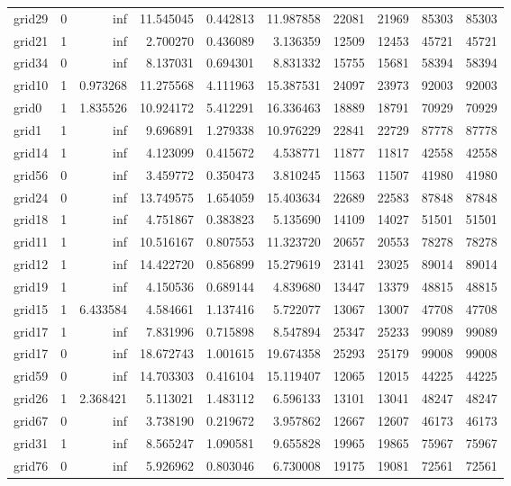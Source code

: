 \begin{longtable}{|l|r|r|r|r|r|r|r|r|r|}
grid29 & 0 & inf & 11.545045 & 0.442813 & 11.987858 & 22081 & 21969 & 85303 & 85303 \\
grid21 & 1 & inf & 2.700270 & 0.436089 & 3.136359 & 12509 & 12453 & 45721 & 45721 \\
grid34 & 0 & inf & 8.137031 & 0.694301 & 8.831332 & 15755 & 15681 & 58394 & 58394 \\
grid10 & 1 & 0.973268 & 11.275568 & 4.111963 & 15.387531 & 24097 & 23973 & 92003 & 92003 \\
grid0 & 1 & 1.835526 & 10.924172 & 5.412291 & 16.336463 & 18889 & 18791 & 70929 & 70929 \\
grid1 & 1 & inf & 9.696891 & 1.279338 & 10.976229 & 22841 & 22729 & 87778 & 87778 \\
grid14 & 1 & inf & 4.123099 & 0.415672 & 4.538771 & 11877 & 11817 & 42558 & 42558 \\
grid56 & 0 & inf & 3.459772 & 0.350473 & 3.810245 & 11563 & 11507 & 41980 & 41980 \\
grid24 & 0 & inf & 13.749575 & 1.654059 & 15.403634 & 22689 & 22583 & 87848 & 87848 \\
grid18 & 1 & inf & 4.751867 & 0.383823 & 5.135690 & 14109 & 14027 & 51501 & 51501 \\
grid11 & 1 & inf & 10.516167 & 0.807553 & 11.323720 & 20657 & 20553 & 78278 & 78278 \\
grid12 & 1 & inf & 14.422720 & 0.856899 & 15.279619 & 23141 & 23025 & 89014 & 89014 \\
grid19 & 1 & inf & 4.150536 & 0.689144 & 4.839680 & 13447 & 13379 & 48815 & 48815 \\
grid15 & 1 & 6.433584 & 4.584661 & 1.137416 & 5.722077 & 13067 & 13007 & 47708 & 47708 \\
grid17 & 1 & inf & 7.831996 & 0.715898 & 8.547894 & 25347 & 25233 & 99089 & 99089 \\
grid17 & 0 & inf & 18.672743 & 1.001615 & 19.674358 & 25293 & 25179 & 99008 & 99008 \\
grid59 & 0 & inf & 14.703303 & 0.416104 & 15.119407 & 12065 & 12015 & 44225 & 44225 \\
grid26 & 1 & 2.368421 & 5.113021 & 1.483112 & 6.596133 & 13101 & 13041 & 48247 & 48247 \\
grid67 & 0 & inf & 3.738190 & 0.219672 & 3.957862 & 12667 & 12607 & 46173 & 46173 \\
grid31 & 1 & inf & 8.565247 & 1.090581 & 9.655828 & 19965 & 19865 & 75967 & 75967 \\
grid76 & 0 & inf & 5.926962 & 0.803046 & 6.730008 & 19175 & 19081 & 72561 & 72561 \\

\end{longtable}

